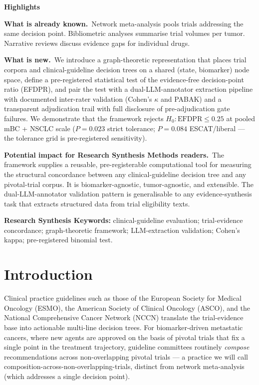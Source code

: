 \documentclass[11pt,a4paper]{article}
\begin{document}
\medskip
\begin{mdframed}[linewidth=0.5pt,roundcorner=4pt,backgroundcolor=gray!8]
\small
\textbf{Highlights}

\textbf{What is already known.}\,
Network meta-analysis pools trials addressing the same decision point. Bibliometric analyses summarise trial volumes per tumor. Narrative reviews discuss evidence gaps for individual drugs.

\textbf{What is new.}\,
We introduce a graph-theoretic representation that places trial corpora and clinical-guideline decision trees on a shared (state, biomarker) node space, define a pre-registered statistical test of the evidence-free decision-point ratio (EFDPR), and pair the test with a dual-LLM-annotator extraction pipeline with documented inter-rater validation (Cohen's $\kappa$ and PABAK) and a transparent adjudication trail with full disclosure of pre-adjudication gate failures. We demonstrate that the framework rejects $H_0: \mathrm{EFDPR} \le 0.25$ at pooled mBC + NSCLC scale ($P = 0.023$ strict tolerance; $P = 0.084$ ESCAT/liberal — the tolerance grid is pre-registered sensitivity).

\textbf{Potential impact for Research Synthesis Methods readers.}\,
The framework supplies a reusable, pre-registerable computational tool for measuring the structural concordance between any clinical-guideline decision tree and any pivotal-trial corpus. It is biomarker-agnostic, tumor-agnostic, and extensible. The dual-LLM-annotator validation pattern is generalisable to any evidence-synthesis task that extracts structured data from trial eligibility texts.
\end{mdframed}

\medskip
\noindent\textbf{Research Synthesis Keywords:} clinical-guideline evaluation; trial-evidence concordance; graph-theoretic framework; LLM-extraction validation; Cohen's kappa; pre-registered binomial test.

\section{Introduction}\label{sec:intro}
Clinical practice guidelines such as those of the European Society for Medical Oncology (ESMO), the American Society of Clinical Oncology (ASCO), and the National Comprehensive Cancer Network (NCCN) translate the trial-evidence base into actionable multi-line decision trees.\citep{cardosoESMO2024,giordano2022asco,hendriks2023esmo,nccn_nsclc_2024} For biomarker-driven metastatic cancers, where new agents are approved on the basis of pivotal trials that fix a single point in the treatment trajectory, guideline committees routinely \emph{compose} recommendations across non-overlapping pivotal trials --- a practice we will call composition-across-non-overlapping-trials, distinct from network meta-analysis (which addresses a single decision point).\citep{rouse2017nma}
\end{document}
